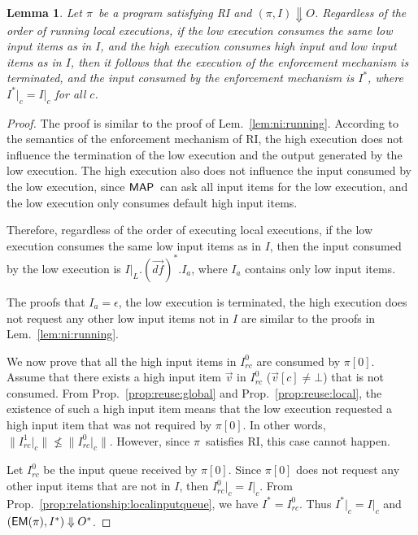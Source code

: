 \documentclass[10pt,a4paper,oneside]{article}
\newtheorem{lemma}{Lemma}[section]
\def\execution#1#2#3{\ensuremath{(#1, #2)\Downarrow#3}}
\def\Irc#1{\ensuremath{I_{rc}^{#1}}}
\def\channeleq#1#2#3{\ensuremath{\restrict{#1}{#3} = \restrict{#2}{#3}}}
\def\restrict#1#2{\ensuremath{{#1}|_{#2}}}
\def\chnl{\ensuremath{c}}
\def\NIL{\ensuremath{\bot}}
\def\sanserif#1{\ensuremath{\sf #1}}
\def\MAP{\ensuremath{\sanserif{MAP}}}
\def\emptyQ{\ensuremath{\epsilon}}
\def\defvec{\ensuremath{\vec{df}}}
\def\EM{\ensuremath{{\sanserif{EM}}}}
\def\Prog{\ensuremath{\pi}}
\def\Progl#1{\ensuremath{\Prog[#1]}}
\def\EMP{\ensuremath{\EM(}\ensuremath{\Prog)}}
\def\length#1{\ensuremath{\parallel#1\parallel}}
\begin{document}
\begin{lemma} \label{lem:ri:running}
Let \Prog\ be a program satisfying RI and \execution{\Prog}{I}{O}. Regardless of the order of running local executions, if the low execution consumes the same low input items as in $I$, and the high execution consumes high input and low input items as in $I$, then it follows that the execution of the enforcement mechanism is terminated, and the input consumed by the enforcement mechanism is $I^*$, where \channeleq{I^*}{I}{\chnl} for all \chnl.
\end{lemma}
\begin{proof}
The proof is similar to the proof of Lem.~\ref{lem:ni:running}.
According to the semantics of the enforcement mechanism of RI, the high execution does not influence the termination of the low execution and the output generated by the low execution. The high execution also does not influence the input consumed by the low execution, since \MAP\ can ask all input items for the low execution,  and the low execution only consumes default high input items.

Therefore, regardless of the order of executing local executions, if the low execution consumes the same low input items as in $I$, then the input consumed by the low execution is $I|_L.(\defvec)^*.I_a$, where $I_a$ contains only low input items.

The proofs that $I_a =\emptyQ$, the low execution is terminated, the high execution does not request any other low input items not in $I$ are similar to the proofs in Lem.~\ref{lem:ni:running}.

We now prove that all the high input items in \Irc{0} are consumed by \Progl{0}. Assume that there exists a high input item $\vec{v}$ in \Irc{0} ($\vec{v}[\chnl] \neq \NIL$) that is not consumed. From Prop.~\ref{prop:reuse:global} and Prop.~\ref{prop:reuse:local}, the existence of such a high input item means that the low execution requested a high input item that was not required by \Progl{0}. In other words, $\length{\restrict{\Irc{1}}{\chnl}} \not\leq \length{\restrict{\Irc{0}}{\chnl}}$. However, since \Prog\ satisfies RI, this case cannot happen.


Let \Irc{0} be the input queue received by \Progl{0}. Since \Progl{0} does not request any other input items that are not in $I$, then \channeleq{\Irc{0}}{I}{\chnl}. From Prop.~\ref{prop:relationship:localinputqueue},  we have $I^* = \Irc{0}$. Thus \channeleq{I^*}{I}{\chnl} and \execution{\EMP}{I^*}{O^*}.
\end{proof}
\end{document}
